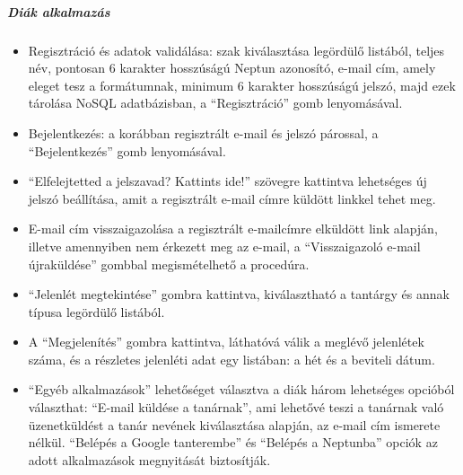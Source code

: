 \subparagraph*{Diák alkalmazás}
\begin{itemize}
    \item {Regisztráció és adatok validálása: szak kiválasztása legördülő listából, teljes név, pontosan 6 karakter hosszúságú Neptun azonosító, e-mail cím, amely eleget tesz a formátumnak, minimum 6 karakter hosszúságú jelszó, majd ezek tárolása NoSQL adatbázisban, a \enquote{Regisztráció} gomb lenyomásával.}

	\item {Bejelentkezés: a korábban regisztrált e-mail és jelszó párossal, a \enquote{Bejelentkezés} gomb lenyomásával.}
	
	\item{\enquote{Elfelejtetted a jelszavad? Kattints ide!} szövegre kattintva lehetséges új jelszó beállítása, amit a regisztrált e-mail címre küldött linkkel tehet meg.}
	
	\item {E-mail cím visszaigazolása a regisztrált e-mailcímre elküldött link alapján, illetve amennyiben nem érkezett meg az e-mail, a \enquote{Visszaigazoló e-mail újraküldése} gombbal megismételhető a procedúra.}
	
	\item {\enquote{Jelenlét megtekintése} gombra kattintva, kiválasztható a tantárgy és annak típusa legördülő listából.}
	
	\item{A \enquote{Megjelenítés} gombra kattintva, láthatóvá válik a meglévő jelenlétek száma, és a részletes jelenléti adat egy listában: a hét és a beviteli dátum.}
	
	\item {\enquote{Egyéb alkalmazások} lehetőséget választva a diák három lehetséges opcióból választhat: \enquote{E-mail küldése a tanárnak}, ami lehetővé teszi a tanárnak való üzenetküldést a tanár nevének kiválasztása alapján, az e-mail cím ismerete nélkül. \enquote{Belépés a Google tanterembe} és \enquote{Belépés a Neptunba} opciók az adott alkalmazások megnyitását biztosítják.}\\
\end{itemize}


